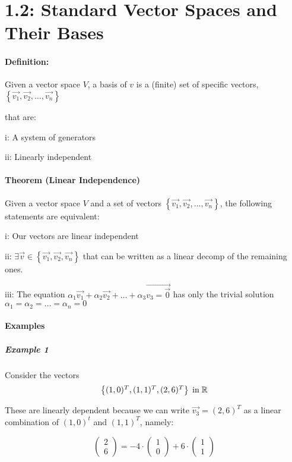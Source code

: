 \documentclass[a4paper]{article}
\begin{document}
\part*{1.2: Standard Vector Spaces and Their Bases}

\subsection*{Definition:}

Given a vector space $V$, a basis of $v$ is a (finite) set of specific vectors, $\left\{ \vec{v_{1}}, \vec{v_{2}}, \dots, \vec{v_{n}} \right\}$

that are:

i: A system of generators

ii: Linearly independent


\subsection*{Theorem (Linear Independence)}

Given a vector space $V$ and a set of vectors $\left\{ \vec{v_{1}}, \vec{v_{2}}, \dots, \vec{v_{n}} \right\}$, the following statements are equivalent:

i: Our vectors are linear independent

ii: $\exists \vec{v} \in \left\{ \vec{v_1}, \vec{v_2}, \vec{v_n} \right\}$ that can be written as a linear decomp of the remaining ones.

iii: The equation $\alpha_1 \vec{v_1} + \alpha_2 \vec{v_2} + \dots + \alpha_3 \vec{v_3 = \vec{0}}$ has only the trivial solution $\alpha_1 = \alpha_2 = \dots = \alpha_n = 0$

\subsection*{Examples}
\subsubsection*{Example 1}

Consider the vectors
\[
\begin{Bmatrix}
	(1,0)^T, (1,1)^T, (2,6)^T
\end{Bmatrix}
\; \text{in} \; \mathbb{R}
\]

These are linearly dependent because we can write $\vec{v_3} = (2,6)^T$ as a linear combination of $(1,0)^t$ and $(1,1)^T$, namely:

\[
	\begin{pmatrix}
		2 \\
		6
	\end{pmatrix}
	=
	-4 \cdot \begin{pmatrix}
		1 \\
		0
	\end{pmatrix}
	+
	6 \cdot	\begin{pmatrix}
		1 \\
		1
	\end{pmatrix}
\]
\end{document}
